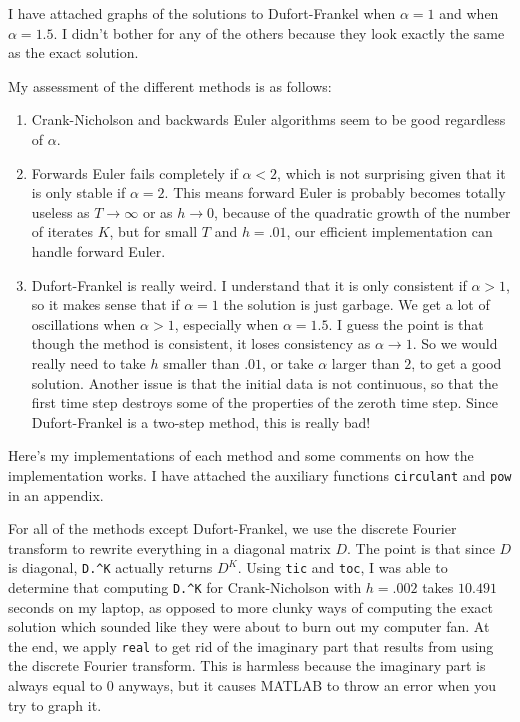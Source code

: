 \documentclass[10pt]{article}
\theoremstyle{definition}
\begin{document}
I have attached graphs of the solutions to Dufort-Frankel when $\alpha = 1$ and when $\alpha = 1.5$. I didn't bother for any of the others because they look exactly the same as the exact solution.

My assessment of the different methods is as follows:
\begin{enumerate}
\item Crank-Nicholson and backwards Euler algorithms seem to be good regardless of $\alpha$.
\item Forwards Euler fails completely if $\alpha < 2$, which is not surprising given that it is only stable if $\alpha = 2$. This means forward Euler is probably becomes totally useless as $T \to \infty$ or as $h \to 0$, because of the quadratic growth of the number of iterates $K$, but for small $T$ and $h = .01$, our efficient implementation can handle forward Euler.
\item Dufort-Frankel is really weird. I understand that it is only consistent if $\alpha > 1$, so it makes sense that if $\alpha = 1$ the solution is just garbage. We get a lot of oscillations when $\alpha > 1$, especially when $\alpha = 1.5$. I guess the point is that though the method is consistent, it loses consistency as $\alpha \to 1$. So we would really need to take $h$ smaller than $.01$, or take $\alpha$ larger than $2$, to get a good solution. Another issue is that the initial data is not continuous, so that the first time step destroys some of the properties of the zeroth time step. Since Dufort-Frankel is a two-step method, this is really bad!
\end{enumerate}

Here's my implementations of each method and some comments on how the implementation works.
I have attached the auxiliary functions \verb+circulant+ and \verb+pow+ in an appendix.

For all of the methods except Dufort-Frankel, we use the discrete Fourier transform to rewrite everything in a diagonal matrix $D$.
The point is that since $D$ is diagonal, \verb+D.^K+ actually returns $D^K$.
Using \verb+tic+ and \verb+toc+, I was able to determine that computing \verb+D.^K+ for Crank-Nicholson with $h = .002$ takes $10.491$ seconds on my laptop, as opposed to more clunky ways of computing the exact solution which sounded like they were about to burn out my computer fan.
At the end, we apply \verb+real+ to get rid of the imaginary part that results from using the discrete Fourier transform.
This is harmless because the imaginary part is always equal to $0$ anyways, but it causes MATLAB to throw an error when you try to graph it.
\end{document}
